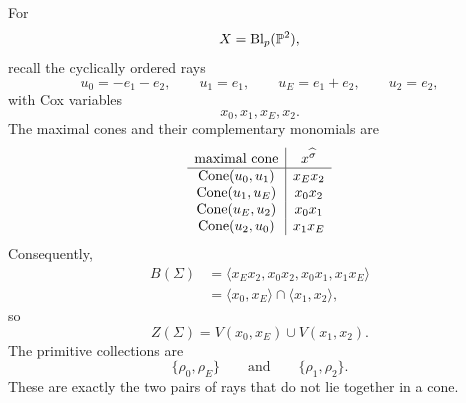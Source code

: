 For
\[
X=\Blp{\PP^2}{p},
\]
recall the cyclically ordered rays
\[
u_0=-e_1-e_2,
\qquad
u_1=e_1,
\qquad
u_E=e_1+e_2,
\qquad
u_2=e_2,
\]
with Cox variables
\[
x_0,x_1,x_E,x_2.
\]
The maximal cones and their complementary monomials are
\[
\begin{array}{c|c}
\text{maximal cone}&x^{\widehat\sigma}\\
\hline
\Cone{u_0,u_1}&x_Ex_2\\
\Cone{u_1,u_E}&x_0x_2\\
\Cone{u_E,u_2}&x_0x_1\\
\Cone{u_2,u_0}&x_1x_E
\end{array}
\]
Consequently,
\[
\begin{aligned}
B(\Sigma)
&=
\langle x_Ex_2,x_0x_2,x_0x_1,x_1x_E\rangle
\\
&=
\langle x_0,x_E\rangle
\cap
\langle x_1,x_2\rangle,
\end{aligned}
\]
so
\[
\boxed{
Z(\Sigma)
=
V(x_0,x_E)
\cup
V(x_1,x_2).
}
\]
The primitive collections are
\[
\{\rho_0,\rho_E\}
\qquad\text{and}\qquad
\{\rho_1,\rho_2\}.
\]
These are exactly the two pairs of rays that do not lie together in a
cone.

